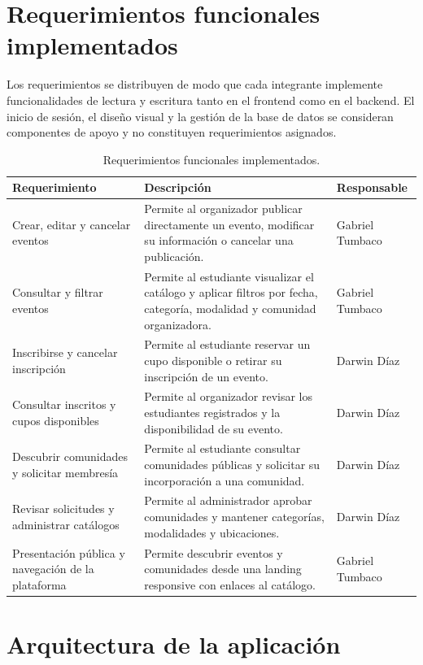 \documentclass[12pt]{article}
\begin{document}
\section{Requerimientos funcionales implementados}

Los requerimientos se distribuyen de modo que cada integrante implemente funcionalidades de lectura y escritura tanto en el frontend como en el backend. El inicio de sesión, el diseño visual y la gestión de la base de datos se consideran componentes de apoyo y no constituyen requerimientos asignados.

\begin{table}[h!]
\centering
\small
\begin{tabularx}{\textwidth}{p{3.3cm}Yp{2.8cm}}
\toprule
\textbf{Requerimiento} & \textbf{Descripción} & \textbf{Responsable} \\
\midrule
Crear, editar y cancelar eventos & Permite al organizador publicar directamente un evento, modificar su información o cancelar una publicación. & Gabriel Tumbaco \\
Consultar y filtrar eventos & Permite al estudiante visualizar el catálogo y aplicar filtros por fecha, categoría, modalidad y comunidad organizadora. & Gabriel Tumbaco \\
Inscribirse y cancelar inscripción & Permite al estudiante reservar un cupo disponible o retirar su inscripción de un evento. & Darwin Díaz \\
Consultar inscritos y cupos disponibles & Permite al organizador revisar los estudiantes registrados y la disponibilidad de su evento. & Darwin Díaz \\
\midrule
Descubrir comunidades y solicitar membresía & Permite al estudiante consultar comunidades públicas y solicitar su incorporación a una comunidad. & Darwin Díaz \\
\midrule
Revisar solicitudes y administrar catálogos & Permite al administrador aprobar comunidades y mantener categorías, modalidades y ubicaciones. & Darwin Díaz \\
\midrule
Presentación pública y navegación de la plataforma & Permite descubrir eventos y comunidades desde una landing responsive con enlaces al catálogo. & Gabriel Tumbaco \\
\bottomrule
\end{tabularx}
\caption{Requerimientos funcionales implementados.}
\end{table}

\section{Arquitectura de la aplicación}
\end{document}
